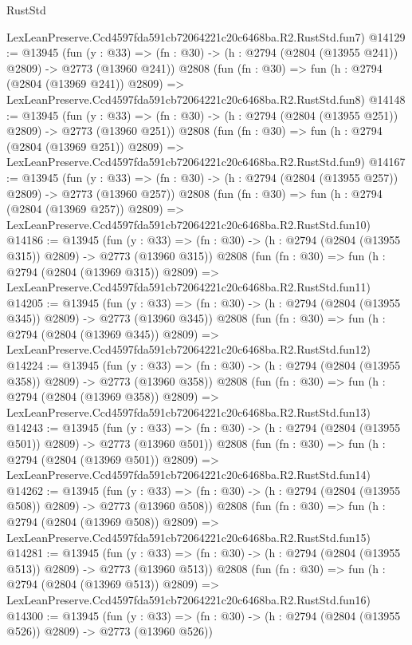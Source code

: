 \begin{lexlean}{RustStd}
\begin{coremodule}
    LexLeanPreserve.Ccd4597fda591cb72064221c20c6468ba.R2.RustStd.fun7)
@14129 := @13945
    (fun (y : @33) => (fn : @30) -> (h : @2794 (@2804 (@13955 @241)) @2809) -> @2773 (@13960 @241))
    @2808
    (fun (fn : @30) =>
    fun (h : @2794 (@2804 (@13969 @241)) @2809) =>
    LexLeanPreserve.Ccd4597fda591cb72064221c20c6468ba.R2.RustStd.fun8)
@14148 := @13945
    (fun (y : @33) => (fn : @30) -> (h : @2794 (@2804 (@13955 @251)) @2809) -> @2773 (@13960 @251))
    @2808
    (fun (fn : @30) =>
    fun (h : @2794 (@2804 (@13969 @251)) @2809) =>
    LexLeanPreserve.Ccd4597fda591cb72064221c20c6468ba.R2.RustStd.fun9)
@14167 := @13945
    (fun (y : @33) => (fn : @30) -> (h : @2794 (@2804 (@13955 @257)) @2809) -> @2773 (@13960 @257))
    @2808
    (fun (fn : @30) =>
    fun (h : @2794 (@2804 (@13969 @257)) @2809) =>
    LexLeanPreserve.Ccd4597fda591cb72064221c20c6468ba.R2.RustStd.fun10)
@14186 := @13945
    (fun (y : @33) => (fn : @30) -> (h : @2794 (@2804 (@13955 @315)) @2809) -> @2773 (@13960 @315))
    @2808
    (fun (fn : @30) =>
    fun (h : @2794 (@2804 (@13969 @315)) @2809) =>
    LexLeanPreserve.Ccd4597fda591cb72064221c20c6468ba.R2.RustStd.fun11)
@14205 := @13945
    (fun (y : @33) => (fn : @30) -> (h : @2794 (@2804 (@13955 @345)) @2809) -> @2773 (@13960 @345))
    @2808
    (fun (fn : @30) =>
    fun (h : @2794 (@2804 (@13969 @345)) @2809) =>
    LexLeanPreserve.Ccd4597fda591cb72064221c20c6468ba.R2.RustStd.fun12)
@14224 := @13945
    (fun (y : @33) => (fn : @30) -> (h : @2794 (@2804 (@13955 @358)) @2809) -> @2773 (@13960 @358))
    @2808
    (fun (fn : @30) =>
    fun (h : @2794 (@2804 (@13969 @358)) @2809) =>
    LexLeanPreserve.Ccd4597fda591cb72064221c20c6468ba.R2.RustStd.fun13)
@14243 := @13945
    (fun (y : @33) => (fn : @30) -> (h : @2794 (@2804 (@13955 @501)) @2809) -> @2773 (@13960 @501))
    @2808
    (fun (fn : @30) =>
    fun (h : @2794 (@2804 (@13969 @501)) @2809) =>
    LexLeanPreserve.Ccd4597fda591cb72064221c20c6468ba.R2.RustStd.fun14)
@14262 := @13945
    (fun (y : @33) => (fn : @30) -> (h : @2794 (@2804 (@13955 @508)) @2809) -> @2773 (@13960 @508))
    @2808
    (fun (fn : @30) =>
    fun (h : @2794 (@2804 (@13969 @508)) @2809) =>
    LexLeanPreserve.Ccd4597fda591cb72064221c20c6468ba.R2.RustStd.fun15)
@14281 := @13945
    (fun (y : @33) => (fn : @30) -> (h : @2794 (@2804 (@13955 @513)) @2809) -> @2773 (@13960 @513))
    @2808
    (fun (fn : @30) =>
    fun (h : @2794 (@2804 (@13969 @513)) @2809) =>
    LexLeanPreserve.Ccd4597fda591cb72064221c20c6468ba.R2.RustStd.fun16)
@14300 := @13945
    (fun (y : @33) => (fn : @30) -> (h : @2794 (@2804 (@13955 @526)) @2809) -> @2773 (@13960 @526))

\end{coremodule}
\end{lexlean}
